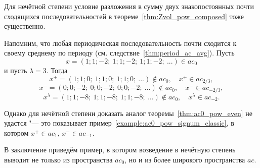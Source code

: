 Для нечётной степени условие разложения в сумму двух знакопостоянных почти сходящихся последовательностей в теореме~\ref{thm:Zvol_pow_composed} тоже существенно.

\begin{example}
	Напомним,
	что любая периодическая последовательность почти сходится к своему среднему по периоду
	(см. следствие~\ref{thm:period_ac_avg}).
	Пусть
	\begin{equation}
		x = (1;1;-2;\ 1;1;-2;\ 1;1;-2;\ ...) \in ac_0
	\end{equation}
	и пусть $\lambda = 3$.
	Тогда
	\begin{equation}
		x^+ = (1;1;0;\ 1;1;0;\ 1;1;0;\ ...) \notin ac_0, \quad x^+ \in ac_{2/3}
		,
	\end{equation}
	\begin{equation}
		x^- = (0;0;-2;\ 0;0;-2;\ 0;0;-2;\ ...) \notin ac_0, \quad x^- \in ac_{-2/3}
		,
	\end{equation}
	\begin{equation}
		x^\lambda = (1;1;-8;\ 1;1;-8;\ 1;1;-8;\ ...) \notin ac_0, \quad x^\lambda \in ac_{-2}
		.
	\end{equation}
\end{example}

Однако для нечётной степени доказать аналог теоремы~\ref{thm:ac0_pow_even} не удастся "--- это показывает пример~\ref{example:ac0_pow_signum_classic}, в котором $x^+\in ac_1$, $x^-\in ac_{-1}$.

В заключение приведём пример, в котором возведение в нечётную степень выводит не только из пространства $ac_0$,
но и из более широкого пространства $ac$.

